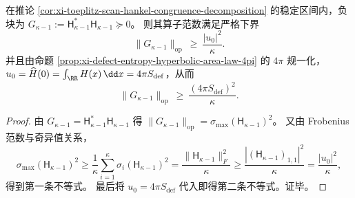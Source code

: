 \begin{corollary}[缺陷熵迫使负块谱质量非退化]\label{cor:xi-defect-entropy-forces-negative-block-mass}
在推论 \ref{cor:xi-toeplitz-scan-hankel-congruence-decomposition} 的稳定区间内，负块为
\(
G_{\kappa-1}:=\mathsf H_{\kappa-1}^\ast\mathsf H_{\kappa-1}\succeq 0
\)。
则其算子范数满足严格下界
\[
\|G_{\kappa-1}\|_{\mathrm{op}}
\ \ge\
\frac{|u_0|^2}{\kappa}.
\]
并且由命题 \ref{prop:xi-defect-entropy-hyperbolic-area-law-4pi} 的 \(4\pi\) 规一化，
\(
u_0=\widehat H(0)=\int_{\RR}H(x)\,\dd x=4\pi S_{\mathrm{def}}
\)，从而
\[
\|G_{\kappa-1}\|_{\mathrm{op}}\ \ge\ \frac{(4\pi S_{\mathrm{def}})^2}{\kappa}.
\]
\end{corollary}
\begin{proof}
由 \(G_{\kappa-1}=\mathsf H_{\kappa-1}^\ast\mathsf H_{\kappa-1}\) 得
\(
\|G_{\kappa-1}\|_{\mathrm{op}}=\sigma_{\max}(\mathsf H_{\kappa-1})^2
\)。
又由 Frobenius 范数与奇异值关系，
\[
\sigma_{\max}(\mathsf H_{\kappa-1})^2
\ge \frac{1}{\kappa}\sum_{i=1}^{\kappa}\sigma_i(\mathsf H_{\kappa-1})^2
=\frac{\|\mathsf H_{\kappa-1}\|_F^2}{\kappa}
\ge \frac{|(\mathsf H_{\kappa-1})_{1,1}|^2}{\kappa}
=\frac{|u_0|^2}{\kappa},
\]
得到第一条不等式。
最后将 \(u_0=4\pi S_{\mathrm{def}}\) 代入即得第二条不等式。证毕。
\end{proof}





\endinput
